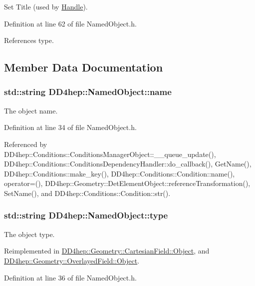 Set Title (used by \hyperlink{class_d_d4hep_1_1_handle}{Handle}). 

Definition at line 62 of file NamedObject.h.

References type.

\subsection{Member Data Documentation}
\hypertarget{class_d_d4hep_1_1_named_object_a4675ccdc57835ec27eef8f2799eb77a2}{
\subsubsection[{name}]{\setlength{\rightskip}{0pt plus 5cm}std::string {\bf DD4hep::NamedObject::name}}}
\label{class_d_d4hep_1_1_named_object_a4675ccdc57835ec27eef8f2799eb77a2}


The object name. 

Definition at line 34 of file NamedObject.h.

Referenced by DD4hep::Conditions::ConditionsManagerObject::\_\-\_\-queue\_\-update(), DD4hep::Conditions::ConditionsDependencyHandler::do\_\-callback(), GetName(), DD4hep::Conditions::make\_\-key(), DD4hep::Conditions::Condition::name(), operator=(), DD4hep::Geometry::DetElementObject::referenceTransformation(), SetName(), and DD4hep::Conditions::Condition::str().\hypertarget{class_d_d4hep_1_1_named_object_a8e17bb5f854b320302be44c68c39a192}{
\subsubsection[{type}]{\setlength{\rightskip}{0pt plus 5cm}std::string {\bf DD4hep::NamedObject::type}}}
\label{class_d_d4hep_1_1_named_object_a8e17bb5f854b320302be44c68c39a192}


The object type. 

Reimplemented in \hyperlink{class_d_d4hep_1_1_geometry_1_1_cartesian_field_1_1_object_a661abde32b68651dc0542aabbe9e448c}{DD4hep::Geometry::CartesianField::Object}, and \hyperlink{class_d_d4hep_1_1_geometry_1_1_overlayed_field_1_1_object_a9cf611593f516274f139d0524d8480de}{DD4hep::Geometry::OverlayedField::Object}.

Definition at line 36 of file NamedObject.h.

